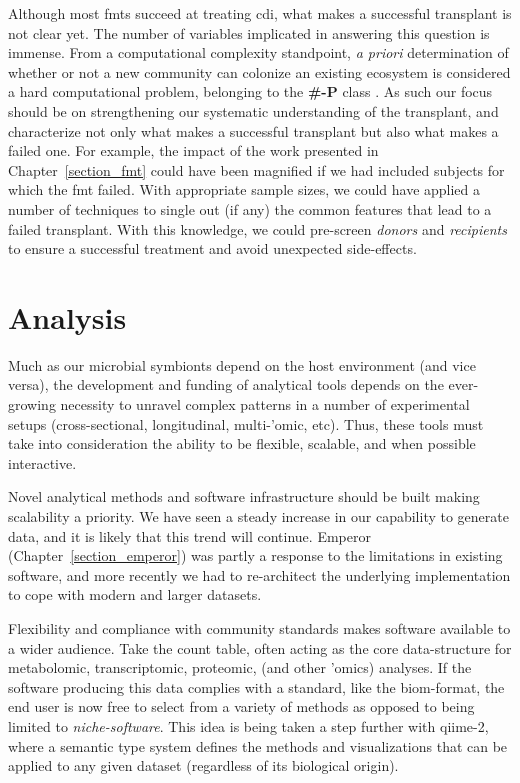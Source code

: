Although most \glspl{fmt} succeed at treating \gls{cdi}, what makes a
successful transplant is not clear yet. The number of variables implicated in
answering this question is immense. From a computational complexity standpoint,
\textit{a priori} determination of whether or not a new community can colonize 
an existing ecosystem is considered a hard computational problem, belonging to 
the \textbf{\#-P} class \cite{RN4266}. As such our focus should be on 
strengthening our systematic understanding of the transplant, and characterize 
not only what makes a successful transplant but also what makes a failed one.  
For example, the impact of the work presented in Chapter~\ref{section_fmt} 
could have been magnified if we had included subjects for which the \gls{fmt} 
failed. With appropriate sample sizes, we could have applied a number of 
techniques to single out (if any) the common features that lead to a failed 
transplant. With this knowledge, we could pre-screen \textit{donors} and 
\textit{recipients} to ensure a successful treatment and avoid unexpected 
side-effects.

\section{Analysis}

Much as our microbial symbionts depend on the host environment (and vice
versa), the development and funding of analytical tools depends on the
ever-growing necessity to unravel complex patterns in a number of experimental
setups (cross-sectional, longitudinal, multi-'omic, etc). Thus, these tools
must take into consideration the ability to be flexible, scalable, and when
possible interactive.

Novel analytical methods and software infrastructure should be built making 
scalability a priority.  We have seen a steady increase in our capability to 
generate data, and it is likely that this trend will continue. Emperor 
(Chapter~\ref{section_emperor}) was partly a response to the limitations in 
existing software, and more recently we had to re-architect the underlying 
implementation to cope with modern and larger datasets.

Flexibility and compliance with community standards makes software available
to a wider audience. Take the count table, often acting as the core
data-structure for metabolomic, transcriptomic, proteomic, (and other 'omics)
analyses. If the software producing this data complies with a standard, like
the \gls{biom}-format, the end user is now free to select from a variety of
methods as opposed to being limited to \textit{niche-software}. This idea is 
being taken a step further with \gls{qiime}-2, where a semantic type system 
defines the methods and visualizations that can be applied to any given dataset 
(regardless of its biological origin).

